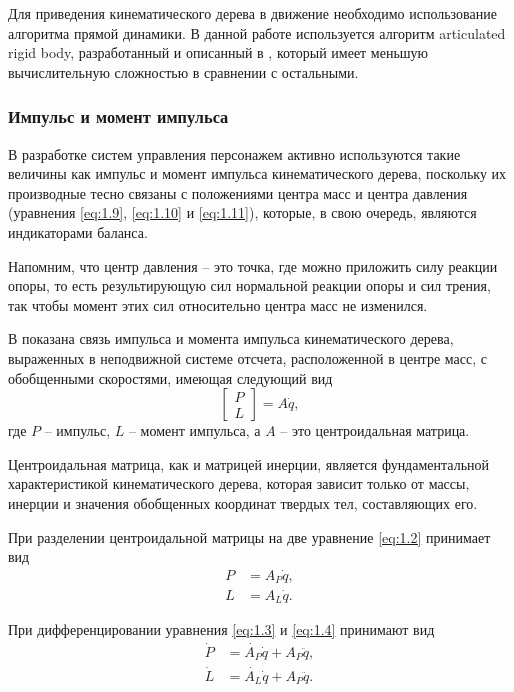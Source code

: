 Для приведения кинематического дерева в движение необходимо использование алгоритма прямой динамики. В данной работе используется алгоритм articulated rigid body, разработанный и описанный в \cite{Featherstone}, который имеет меньшую вычислительную сложностью в сравнении с остальными.

\subsubsection{Импульс и момент импульса}

В разработке систем управления персонажем активно используются такие величины как импульс и момент импульса кинематического дерева, поскольку их производные тесно связаны с положениями центра масс и центра давления (уравнения \ref{eq:1.9}, \ref{eq:1.10} и \ref{eq:1.11}), которые, в свою очередь, являются индикаторами баланса.

Напомним, что центр давления -- это точка, где можно приложить силу реакции опоры, то есть результирующую сил нормальной реакции опоры и сил трения, так чтобы момент этих сил относительно центра масс не изменился.

В \cite{OrinG} показана связь импульса и момента импульса кинематического дерева, выраженных в неподвижной системе отсчета, расположенной в центре масс, с обобщенными скоростями, имеющая следующий вид
\begin{equation*}
\begin{bmatrix} P\\ L \end{bmatrix} = A \dot{q}, \tag{1.2}\label{eq:1.2}
\end{equation*}
где $P$ -- импульс, $L$ -- момент импульса, а $A$ -- это центроидальная матрица.

Центроидальная матрица, как и матрицей инерции, является фундаментальной характеристикой кинематического дерева, которая зависит только от массы, инерции и значения обобщенных координат твердых тел, составляющих его.

При разделении центроидальной матрицы на две уравнение \ref{eq:1.2} принимает вид
\begin{align*}
  P &= A_{P} \dot{q}, \tag{1.3}\label{eq:1.3} \\
  L &= A_{L} \dot{q}. \tag{1.4}\label{eq:1.4}
\end{align*}

При дифференцировании уравнения \ref{eq:1.3} и \ref{eq:1.4} принимают вид
\begin{align*}
  \dot{P} &= \dot{A_{P}} \dot{q} + A_{P} \ddot{q}, \tag{1.5}\label{eq:1.5} \\
  \dot{L} &= \dot{A_{L}} \dot{q} + A_{P} \ddot{q}. \tag{1.6}\label{eq:1.6}
\end{align*}

